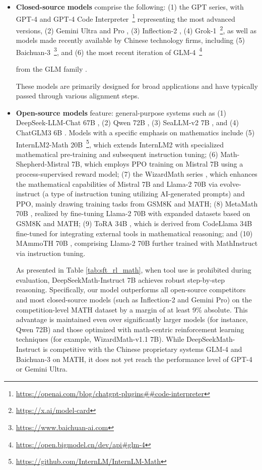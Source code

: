 \begin{itemize}[topsep=0pt]
\begin{itemize}[topsep=0pt]
    \item \textbf{Closed-source models} comprise the following: (1) the GPT series, with GPT-4 \citep{gpt4} and GPT-4 Code Interpreter~\footnote{\url{https://openai.com/blog/chatgpt-plugins\#\#code-interpreter}} representing the most advanced versions, (2) Gemini Ultra and Pro \citep{gemini}, (3) Inflection-2 \citep{inflection-2}, (4) Grok-1~\footnote{\url{https://x.ai/model-card}},
    as well as models made recently available by Chinese technology firms, including (5) Baichuan-3~\footnote{\url{https://www.baichuan-ai.com}},
    and (6) the most recent iteration of GLM-4~\footnote{\url{https://open.bigmodel.cn/dev/api\#glm-4}}

    from the GLM family \citep{glm}.

These models are primarily designed for broad applications and have typically passed through various alignment steps.

\item \textbf{Open-source models} feature: general-purpose systems such as (1) DeepSeek-LLM-Chat 67B \citep{deepseek-llm}, (2) Qwen 72B \citep{qwen}, (3) SeaLLM-v2 7B \citep{seallm}, and (4) ChatGLM3 6B \citep{chatglm3}. Models with a specific emphasis on mathematics include (5) InternLM2-Math 20B~\footnote{\url{https://github.com/InternLM/InternLM-Math}}, which extends InternLM2 with specialized mathematical pre-training and subsequent instruction tuning; (6) Math-Shepherd-Mistral 7B, which employs PPO training \citep{schulman2017proximal} on Mistral 7B \citep{mistral} using a process-supervised reward model; (7) the WizardMath series \citep{wizardmath}, which enhances the mathematical capabilities of Mistral 7B and Llama-2 70B \citep{llama2} via evolve-instruct (a type of instruction tuning utilizing AI-generated prompts) and PPO, mainly drawing training tasks from GSM8K and MATH; (8) MetaMath 70B \citep{metamath}, realized by fine-tuning Llama-2 70B with expanded datasets based on GSM8K and MATH; (9) ToRA 34B \cite{tora}, which is derived from CodeLlama 34B fine-tuned for integrating external tools in mathematical reasoning; and (10) MAmmoTH 70B \citep{MathInstruct}, comprising Llama-2 70B further trained with MathInstruct via instruction tuning.

As presented in Table \ref{tab:sft_rl_math}, when tool use is prohibited during evaluation, DeepSeekMath-Instruct 7B achieves robust step-by-step reasoning. Specifically, our model outperforms all open-source competitors and most closed-source models (such as Inflection-2 and Gemini Pro) on the competition-level MATH dataset by a margin of at least 9\% absolute. This advantage is maintained even over significantly larger models (for instance, Qwen 72B) and those optimized with math-centric reinforcement learning techniques (for example, WizardMath-v1.1 7B). While DeepSeekMath-Instruct is competitive with the Chinese proprietary systems GLM-4 and Baichuan-3 on MATH, it does not yet reach the performance level of GPT-4 or Gemini Ultra.


\end{itemize}
\end{itemize}
